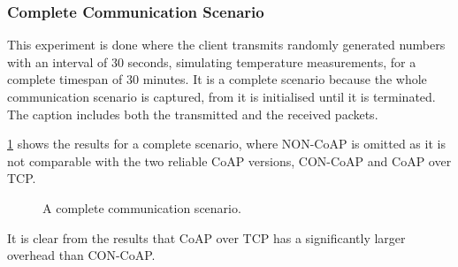 

\subsubsection{Complete Communication Scenario}
This experiment is done where the client transmits randomly generated numbers with an interval of 30 seconds, simulating temperature measurements, for a complete timespan of 30 minutes.
It is a complete scenario because the whole communication scenario is captured, from it is initialised until it is terminated. The caption includes both the transmitted and the received packets.

\figurename{\ref{fig:completescenario}} shows the results for a complete scenario, where NON-CoAP is omitted as it is not comparable with the two reliable CoAP versions, CON-CoAP and CoAP over TCP. 
\begin{figure}[bht]
	\caption{A complete communication scenario.}
	\label{fig:completescenario}
\end{figure}

It is clear from the results that CoAP over TCP has a significantly larger overhead than CON-CoAP.

